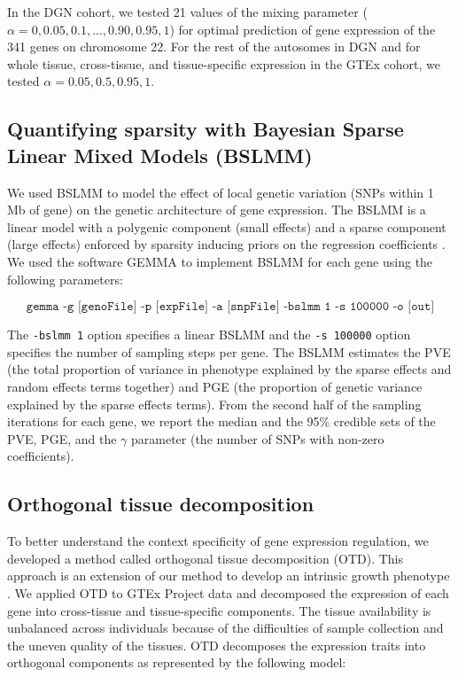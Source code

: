\documentclass[10pt,letterpaper]{article}
\begin{document}
In the DGN cohort, we tested 21 values of the mixing parameter
(\(\alpha=0, 0.05, 0.1, ..., 0.90, 0.95, 1\)) for optimal prediction of
gene expression of the 341 genes on chromosome 22. For the rest of the
autosomes in DGN and for whole tissue, cross-tissue, and tissue-specific
expression in the GTEx cohort, we tested \(\alpha=0.05, 0.5, 0.95, 1\).

\subsection*{Quantifying sparsity with Bayesian Sparse Linear Mixed
Models
(BSLMM)}\label{quantifying-sparsity-with-bayesian-sparse-linear-mixed-models-bslmm}

We used BSLMM \cite{Zhou_2013} to model the effect of local genetic variation
(SNPs within 1 Mb of gene) on the genetic architecture of gene
expression. The BSLMM is a linear model with a polygenic component (small effects) and a sparse component (large effects)
enforced by sparsity inducing priors on the
regression coefficients \cite{Zhou_2013}. We used the software GEMMA \cite{Zhou_2012} to
implement BSLMM for each gene using the following parameters:

\[ \texttt{gemma -g [genoFile] -p [expFile] -a [snpFile] -bslmm 1 -s 100000 -o [out]} \]

The \texttt{-bslmm 1} option specifies a linear BSLMM and the
\texttt{-s 100000} option specifies the number of sampling steps per
gene. The BSLMM estimates the PVE (the total proportion of variance in
phenotype explained by the sparse effects and random effects terms
together) and PGE (the proportion of genetic variance explained by the
sparse effects terms). From the second half of the sampling iterations
for each gene, we report the median and the 95\% credible sets of the
PVE, PGE, and the \textbar{}\(\gamma\)\textbar{} parameter (the number
of SNPs with non-zero coefficients).

\subsection*{Orthogonal tissue
decomposition}\label{orthogonal-tissue-decomposition}

To better understand the context specificity of gene expression
regulation, we developed a method called orthogonal tissue decomposition
(OTD). This approach is an extension of our method to develop an
intrinsic growth phenotype \cite{Im_2012}. We applied OTD to GTEx Project
\cite{Ardlie_2015} data and decomposed the expression of each gene into
cross-tissue and tissue-specific components. The tissue availability is
unbalanced across individuals because of the difficulties of sample
collection and the uneven quality of the tissues. OTD decomposes the
expression traits into orthogonal components as represented by the
following model:
\end{document}
